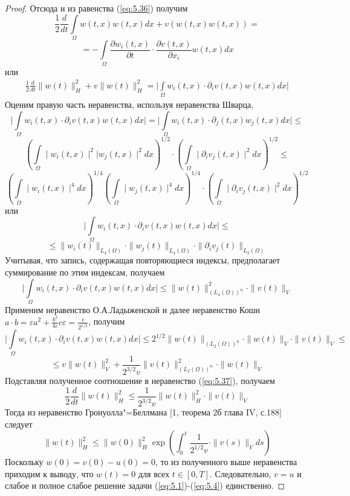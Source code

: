 \begin{proof}
    Отсюда и из равенства (\ref{eq:5.36}) получим
    $$\frac{1}{2}\frac{d}{dt}\int\limits_\Omega w(t,x)w(t,x)dx+v(w(t,x)w(t,x))=$$
    $$= -\int\limits_\Omega\frac{\partial w_i(t,x)}{\partial t}\cdot\frac{\partial v(t,x)}{\partial x_i}w(t,x)dx$$
    или
    \begin{equation}\label{eq:5.37}
        \begin{gathered}
            \frac{1}{2}\frac{d}{dt}\parallel w(t)\parallel_H^2+v\parallel w(t)\parallel_H^2=\bigg|\int\limits_\Omega w_i(t,x)\cdot\partial_iv(t,x)w(t,x)dx\bigg|
        \end{gathered}
    \end{equation}
    Оценим правую часть неравенства, используя неравенства Шварца,
    $$\bigg|\int\limits_\Omega w_i(t,x)\cdot\partial_iv(t,x)w(t,x)dx\bigg|=\bigg|\int\limits_\Omega w_i(t,x)\cdot\partial_j(t,x)w_j(t,x)dx\bigg|\le$$
    $$\left(\int\limits_\Omega \mid w_i(t,x)\mid^2|w_j(t,x)\mid^2dx \right)^{1/2}\cdot\left(\int\limits_\Omega\mid\partial_iv_j(t,x) \mid^2dx \right)^{1/2}\le$$
    $$\left(\int\limits_\Omega \mid w_i(t,x)\mid^4dx\right)^{1/4}\left( \int\limits_\Omega \mid w_j(t,x)\mid^4dx\right)^{1/4}\cdot\left(\int\limits_\Omega\mid\partial_iv_j(t,x) \mid^2dx \right)^{1/2}$$
    или
    $$\bigg|\int\limits_\Omega w_i(t,x)\cdot\partial_iv(t,x)w(t,x)dx\bigg|\le$$
    $$\le\parallel w_i(t)\parallel_{L_4(\Omega)}\cdot\parallel w_j(t)\parallel_{L_4(\Omega)}\cdot\parallel\partial_iv_j(t)\parallel_{L_2(\Omega)}$$
    Учитывая, что запись, содержащая повторяющиеся индексы, предполагает суммирование по этим индексам, получаем
    $$\bigg|\int\limits_\Omega w_i(t,x)\cdot\partial_iv(t,x)w(t,x)dx\bigg|\le\parallel w(t)\parallel_{(L_4(\Omega))^n}^2\cdot\parallel v(t)\parallel_V$$
    Применим неравенство О.А.Ладыженской и далее неравенство Коши \linebreak
    $a\cdot b=\varepsilon a^2+\frac{b^2}{4\varepsilon}c\varepsilon=\frac{v}{2^{1/2}}$, получим
    $$\bigg|\int\limits_\Omega w_i(t,x)\cdot\partial_iv(t,x)w(t,x)dx\bigg|\le 2^{1/2}\parallel w(t)\parallel_{(L_2(\Omega))^n}\cdot\parallel w(t)\parallel_V\cdot\parallel v(t)\parallel_V\le$$
    $$\le v\parallel w(t)\parallel_V^2+\frac{1}{2^{3/2}v}\parallel v(t)\parallel_{(L_2(\Omega))^n}^2\cdot\parallel w(t)\parallel_V$$
    Подставляя полученное соотношение в неравенство (\ref{eq:5.37}), получаем
    $$\frac{1}{2}\frac{d}{dt}\parallel w(t)\parallel_H^2\le\frac{1}{2^{3/2}v}\parallel w(t)\parallel_H^2\cdot\parallel v(t)\parallel_V$$
    Тогда из неравенство Гронуолла"=Беллмана [1, теорема 2б глава IV, с.188] следует
    $$\parallel w(t)\parallel_H^2\le\parallel w(0)\parallel_H^2\exp\left(\int_0^t\frac{1}{2^{1/2}v}\cdot\parallel v(s)\parallel_Vds\right)$$
    Поскольку $w(0) = v(0)- u(0) = 0$, то из полученного выше неравенства приходим к выводу, что $w(t)=0$ для всех $t\in[0,T]$. Следовательно, $v=u$ и слабое и полное слабое решение задачи (\ref{eq:5.1})-(\ref{eq:5.4}) единственно.
\end{proof}
